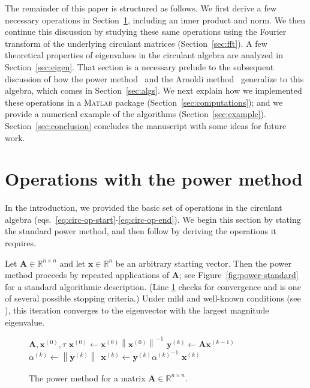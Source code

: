 \documentclass[1p,authoryear,letterpaper]{elsarticle}
\renewcommand{\cite}{\citep}
\providecommand{\RR}{\mathbb{R}}
\providecommand{\normof}[2][]{\left\| #2 \right\|_{#1}}\providecommand{\nnormof}[2][]{\| #2 \|_{#1}}\providecommand{\itr}[2]{#1^{(#2)}}
\providecommand{\itn}[1]{^{(#1)}}\providecommand{\cardof}[1]{\left| #1 \right|}
\DeclareMathOperator{\sign}{sign}
\providecommand{\mat}{\boldsymbol}
\renewcommand{\vec}{\mathbf}
\providecommand{\mA}{\ensuremath{\mat{A}}}
\providecommand{\vx}{\ensuremath{\vec{x}}}
\providecommand{\vy}{\ensuremath{\vec{y}}}
\newcommand{\Matlab}{\textsc{Matlab}\xspace}
\begin{document}
The remainder of this paper is structured as follows.
We first derive a few necessary operations in Section~\ref{sec:ops}, 
including an inner product and norm. We then continue this discussion by studying these same operations 
using the Fourier transform of the underlying circulant matrices 
(Section~\ref{sec:fft}).  A few theoretical properties of eigenvalues 
in the circulant algebra are analyzed in Section~\ref{sec:eigen}.  
That section is a necessary prelude to the subsequent discussion of 
how the power method~\cite{vonMises1929-power} and the Arnoldi 
method~\cite{Krylov1931-equations,lanczos1950-iteration,Arnoldi1951-minimized}
 generalize to this algebra, 
which comes in Section~\ref{sec:algs}.
We next explain how we implemented these operations in a \Matlab 
package (Section~\ref{sec:computations}); and we provide a numerical 
example of the algorithms (Section~\ref{sec:example}).  
Section~\ref{sec:conclusion} concludes the manuscript with some 
ideas for future work.






\section{Operations with the power method}
\label{sec:ops}

In the introduction, we provided the basic set of operations in the circulant algebra 
(eqs.~\eqref{eq:circ-op-start}-\eqref{eq:circ-op-end}).  We begin this section by stating the standard power method, and then follow by deriving the operations it requires.

Let $\mA \in \RR^{n \times n}$ and let $\vx \in \RR^{n}$ be an arbitrary starting vector.  Then the power method proceeds by repeated applications of $\mA$; see Figure~\ref{fig:power-standard} for a standard algorithmic description. (Line \ref{alg:power:conv} checks for convergence and is one of several possible stopping criteria.) Under mild and well-known conditions (see \citet{Stewart2001-eigensystems}), this iteration converges to the eigenvector with the largest magnitude eigenvalue.

\begin{figure}
\caption{The power method for a matrix $\mA \in \RR^{n \times n}$.
}
\label{fig:power-standard}
\begin{algorithmic}[1]
\REQUIRE  $\mA, \vx\itn{0}, \tau$
\STATE $\vx\itn{0} \leftarrow \vx\itn{0} \normof{\vx\itn{0}}^{-1}$
  \STATE $\vy\itn{k} \leftarrow \mA  \vx\itn{k-1}$
  \STATE $\alpha\itn{k} \leftarrow \normof{\vy\itn{k}}$
  \STATE $\vx\itn{k} \leftarrow \vy\itn{k}  {\alpha\itn{k}}^{-1}$
  \IF {${\,\|{\sign(x_1\itn{k}) \vx\itn{k} - \sign(x_1\itn{k-1}) \vx\itn{k-1}}\|\,} < \tau$} \label{alg:power:conv}
    \RETURN $\vx\itn{k}$
  \ENDIF
\ENDFOR
\end{algorithmic}
\end{figure}
\end{document}
